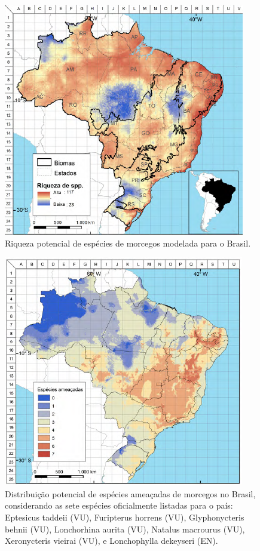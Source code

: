 \documentclass[
  oneside]{scrbook}
\begin{document}
\begin{figure}

{\centering \includegraphics[width=0.8\linewidth]{imagens/figura04} 

}

\caption{Riqueza potencial de espécies de morcegos modelada para o Brasil.}\label{fig:04}
\end{figure}

\begin{figure}

{\centering \includegraphics[width=0.8\linewidth]{imagens/figura05} 

}

\caption{Distribuição potencial de espécies ameaçadas de morcegos no Brasil, considerando as sete espécies oficialmente listadas para o país: Eptesicus taddeii (VU), Furipterus horrens (VU), Glyphonycteris behnii (VU), Lonchorhina aurita (VU), Natalus macrourus (VU), Xeronycteris vieirai (VU), e Lonchophylla dekeyseri (EN).}\label{fig:05}
\end{figure}
\end{document}
